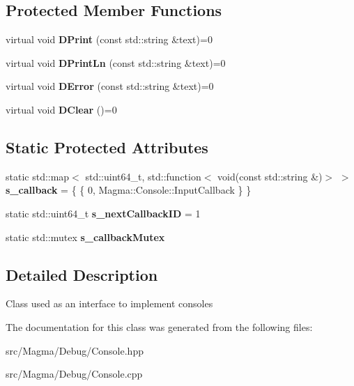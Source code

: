 \subsection*{Protected Member Functions}
\begin{DoxyCompactItemize}
\item 
\mbox{\label{class_magma_1_1_console_a119a54cd773142c5583634cdc10ff4d7}} 
virtual void {\bfseries D\+Print} (const std\+::string \&text)=0
\item 
\mbox{\label{class_magma_1_1_console_ad8ced7621ec1503e8e82edf66e5297ce}} 
virtual void {\bfseries D\+Print\+Ln} (const std\+::string \&text)=0
\item 
\mbox{\label{class_magma_1_1_console_a1d4b23cf878ce761181f3bc1be76c3cd}} 
virtual void {\bfseries D\+Error} (const std\+::string \&text)=0
\item 
\mbox{\label{class_magma_1_1_console_abd509ffc20c8f5ac0f05229de2f48e0d}} 
virtual void {\bfseries D\+Clear} ()=0
\end{DoxyCompactItemize}
\subsection*{Static Protected Attributes}
\begin{DoxyCompactItemize}
\item 
\mbox{\label{class_magma_1_1_console_a84139fb985f2c60a46ba0f273a3e1081}} 
static std\+::map$<$ std\+::uint64\+\_\+t, std\+::function$<$ void(const std\+::string \&)$>$ $>$ {\bfseries s\+\_\+callback} = \{ \{ 0, Magma\+::\+Console\+::\+Input\+Callback \} \}
\item 
\mbox{\label{class_magma_1_1_console_a6f7b7d8347851db498c65ac149f1e024}} 
static std\+::uint64\+\_\+t {\bfseries s\+\_\+next\+Callback\+ID} = 1
\item 
\mbox{\label{class_magma_1_1_console_a35aafe4a576c866ba98fc0d092f4b1e9}} 
static std\+::mutex {\bfseries s\+\_\+callback\+Mutex}
\end{DoxyCompactItemize}


\subsection{Detailed Description}
Class used as an interface to implement consoles 



The documentation for this class was generated from the following files\+:\begin{DoxyCompactItemize}
\item 
src/\+Magma/\+Debug/Console.\+hpp\item 
src/\+Magma/\+Debug/Console.\+cpp\end{DoxyCompactItemize}
